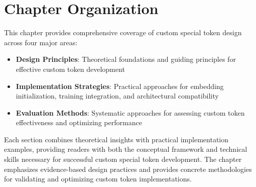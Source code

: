 \section{Chapter Organization}

This chapter provides comprehensive coverage of custom special token design across four major areas:

\begin{itemize}
\item \textbf{Design Principles}: Theoretical foundations and guiding principles for effective custom token development
\item \textbf{Implementation Strategies}: Practical approaches for embedding initialization, training integration, and architectural compatibility
\item \textbf{Evaluation Methods}: Systematic approaches for assessing custom token effectiveness and optimizing performance
\end{itemize}

Each section combines theoretical insights with practical implementation examples, providing readers with both the conceptual framework and technical skills necessary for successful custom special token development. The chapter emphasizes evidence-based design practices and provides concrete methodologies for validating and optimizing custom token implementations.